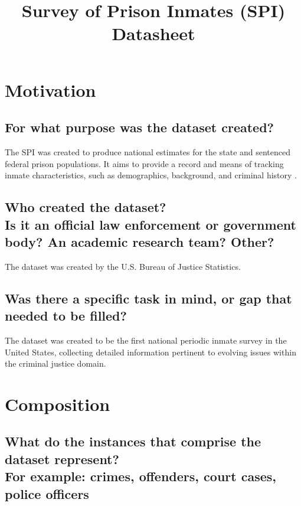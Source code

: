 \documentclass[letterpaper, 10 pt, conference]{ieeeconf}  %
\title{\LARGE \bf
Survey of Prison Inmates (SPI) \\{\color{blue}Datasheet}
}
\newcommand{\subtitle}[1]{{\\ \small \normalfont \color{purple} #1}}
\begin{document}
\maketitle
\thispagestyle{empty}
\pagestyle{empty}

\section{Motivation}

\subsection{For what purpose was the dataset created?}

The SPI was created to produce national estimates for the state and sentenced federal prison populations. It aims to provide a record and means of tracking inmate characteristics, such as demographics, background, and criminal history \cite{glaze2019methodology}.

\subsection{Who created the dataset? \subtitle{Is it an official law enforcement or government body? An academic research team? Other?}}

The dataset was created by the U.S. Bureau of Justice Statistics.

\subsection{Was there a specific task in mind, or gap that needed to be filled?}

The dataset was created to be the first national periodic inmate survey in the United States, collecting detailed information pertinent to evolving issues within the criminal justice domain.

\section{Composition}

\subsection{What do the instances that comprise the dataset represent? \subtitle{For example: crimes, offenders, court cases, police officers}}
\end{document}
